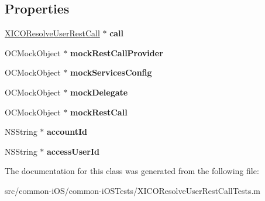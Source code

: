 \subsection*{Properties}
\begin{DoxyCompactItemize}
\item 
\hypertarget{interface_x_i_c_o_resolve_user_rest_call_tests_a0e46e8ea153515338f40682e8fbf3d73}{}\label{interface_x_i_c_o_resolve_user_rest_call_tests_a0e46e8ea153515338f40682e8fbf3d73} 
\hyperlink{interface_x_i_c_o_resolve_user_rest_call}{X\+I\+C\+O\+Resolve\+User\+Rest\+Call} $\ast$ {\bfseries call}
\item 
\hypertarget{interface_x_i_c_o_resolve_user_rest_call_tests_aa72b902e52497a24be6d30f6ce9de22e}{}\label{interface_x_i_c_o_resolve_user_rest_call_tests_aa72b902e52497a24be6d30f6ce9de22e} 
O\+C\+Mock\+Object $\ast$ {\bfseries mock\+Rest\+Call\+Provider}
\item 
\hypertarget{interface_x_i_c_o_resolve_user_rest_call_tests_a051811f0e0b90c99cf1bf866b66e8676}{}\label{interface_x_i_c_o_resolve_user_rest_call_tests_a051811f0e0b90c99cf1bf866b66e8676} 
O\+C\+Mock\+Object $\ast$ {\bfseries mock\+Services\+Config}
\item 
\hypertarget{interface_x_i_c_o_resolve_user_rest_call_tests_af47cce38e81366011d71ff21525e2fba}{}\label{interface_x_i_c_o_resolve_user_rest_call_tests_af47cce38e81366011d71ff21525e2fba} 
O\+C\+Mock\+Object $\ast$ {\bfseries mock\+Delegate}
\item 
\hypertarget{interface_x_i_c_o_resolve_user_rest_call_tests_affecc94b51412e606c0e52826e9658cb}{}\label{interface_x_i_c_o_resolve_user_rest_call_tests_affecc94b51412e606c0e52826e9658cb} 
O\+C\+Mock\+Object $\ast$ {\bfseries mock\+Rest\+Call}
\item 
\hypertarget{interface_x_i_c_o_resolve_user_rest_call_tests_aa43c6189a3d4ee232702c11a5250624a}{}\label{interface_x_i_c_o_resolve_user_rest_call_tests_aa43c6189a3d4ee232702c11a5250624a} 
N\+S\+String $\ast$ {\bfseries account\+Id}
\item 
\hypertarget{interface_x_i_c_o_resolve_user_rest_call_tests_aeb68293ebb572e761048c183cab38584}{}\label{interface_x_i_c_o_resolve_user_rest_call_tests_aeb68293ebb572e761048c183cab38584} 
N\+S\+String $\ast$ {\bfseries access\+User\+Id}
\end{DoxyCompactItemize}


The documentation for this class was generated from the following file\+:\begin{DoxyCompactItemize}
\item 
src/common-\/i\+O\+S/common-\/i\+O\+S\+Tests/X\+I\+C\+O\+Resolve\+User\+Rest\+Call\+Tests.\+m\end{DoxyCompactItemize}

